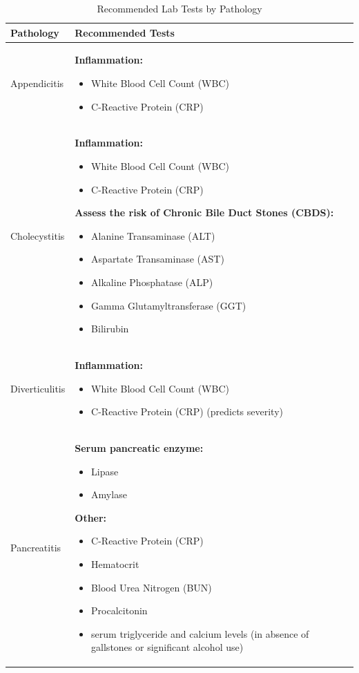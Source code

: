 \documentclass[manuscript, nonacm]{acmart}
\begin{document}
\begin{table}[H]
\centering
\small
\begin{tabular}{p{2.5cm}p{5cm}}
\toprule
\textbf{Pathology} & \textbf{Recommended Tests} \\
\midrule
Appendicitis & 
\textbf{Inflammation:}
\begin{itemize}[leftmargin=*, nosep, itemsep=0pt]
\item White Blood Cell Count (WBC)
\item C-Reactive Protein (CRP)
\end{itemize} \\
\midrule
Cholecystitis & 
\textbf{Inflammation:}
\begin{itemize}[leftmargin=*, nosep, itemsep=0pt]
\item White Blood Cell Count (WBC)
\item C-Reactive Protein (CRP)
\end{itemize}
\textbf{Assess the risk of Chronic Bile Duct Stones (CBDS):}
\begin{itemize}[leftmargin=*, nosep, itemsep=0pt]
\item Alanine Transaminase (ALT)
\item Aspartate Transaminase (AST)
\item Alkaline Phosphatase (ALP)
\item Gamma Glutamyltransferase (GGT)
\item Bilirubin
\end{itemize} \\
\midrule
Diverticulitis & 
\textbf{Inflammation:}
\begin{itemize}[leftmargin=*, nosep, itemsep=0pt]
\item White Blood Cell Count (WBC)
\item C-Reactive Protein (CRP) (predicts severity)
\end{itemize} \\
\midrule
Pancreatitis & 
\textbf{Serum pancreatic enzyme:}
\begin{itemize}[leftmargin=*, nosep, itemsep=0pt]
\item Lipase
\item Amylase
\end{itemize}
\textbf{Other:}
\begin{itemize}[leftmargin=*, nosep, itemsep=0pt]
\item C-Reactive Protein (CRP)
\item Hematocrit
\item Blood Urea Nitrogen (BUN)
\item Procalcitonin
\item serum triglyceride and calcium levels (in absence of gallstones or significant alcohol use)
\end{itemize} \\
\bottomrule
\end{tabular}
\caption{Recommended Lab Tests by Pathology}
\label{tab:lab_tests}
\end{table}
\end{document}
